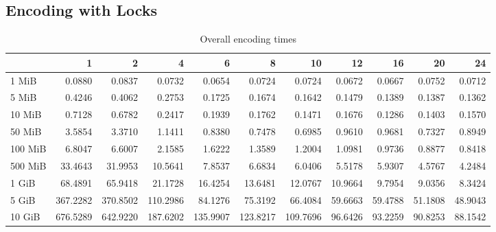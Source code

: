 \subsection{Encoding with Locks}
\begin{table}[!h]
	\caption{Overall encoding times}
	\begin{tabular}{lrrrrrrrrrr}
		\toprule
		\diagbox{File sizes }{Threads} &        1  &        2  &        4  &        6  &        8  &        10 &       12 &       16 &       20 &       24 \\
		\midrule
		1 MiB   &    0.0880 &    0.0837 &    0.0732 &    0.0654 &    0.0724 &    0.0724 &   0.0672 &   0.0667 &   0.0752 &   0.0712 \\
		5 MiB   &    0.4246 &    0.4062 &    0.2753 &    0.1725 &    0.1674 &    0.1642 &   0.1479 &   0.1389 &   0.1387 &   0.1362 \\
		10 MiB  &    0.7128 &    0.6782 &    0.2417 &    0.1939 &    0.1762 &    0.1471 &   0.1676 &   0.1286 &   0.1403 &   0.1570 \\
		50 MiB  &    3.5854 &    3.3710 &    1.1411 &    0.8380 &    0.7478 &    0.6985 &   0.9610 &   0.9681 &   0.7327 &   0.8949 \\
		100 MiB &    6.8047 &    6.6007 &    2.1585 &    1.6222 &    1.3589 &    1.2004 &   1.0981 &   0.9736 &   0.8877 &   0.8418 \\
		500 MiB &   33.4643 &   31.9953 &   10.5641 &    7.8537 &    6.6834 &    6.0406 &   5.5178 &   5.9307 &   4.5767 &   4.2484 \\
		1 GiB   &   68.4891 &   65.9418 &   21.1728 &   16.4254 &   13.6481 &   12.0767 &  10.9664 &   9.7954 &   9.0356 &   8.3424 \\
		5 GiB   &  367.2282 &  370.8502 &  110.2986 &   84.1276 &   75.3192 &   66.4084 &  59.6663 &  59.4788 &  51.1808 &  48.9043 \\
		10 GiB  &  676.5289 &  642.9220 &  187.6202 &  135.9907 &  123.8217 &  109.7696 &  96.6426 &  93.2259 &  90.8253 &  88.1542 \\
		\bottomrule
	\end{tabular}
	
\end{table}
